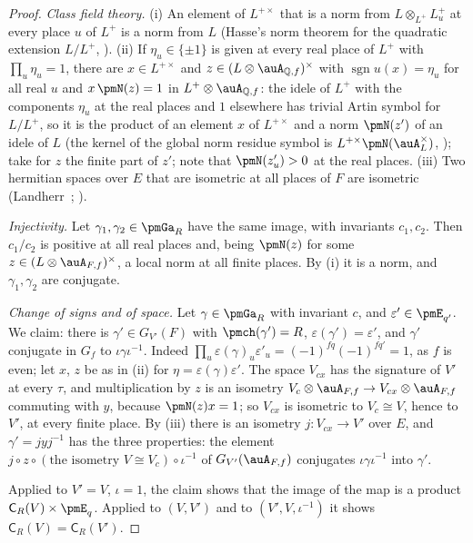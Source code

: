 \documentclass[10pt]{amsart}
\theoremstyle{definition}
\theoremstyle{remark}
\newcommand{\Q}{\mathbb Q}
\begin{document}
\begin{proof}
\emph{Class field theory.} (i) An element of $L^{+\times}$ that is a norm from $L\otimes_{L^+}L^+_u$
at every place $u$ of $L^+$ is a norm from $L$ (Hasse's norm theorem for the quadratic extension
$L/L^+$, \cite[Chapter~VI, Corollary~(4.5)]{Neukirch}). (ii) If $\eta_u\in\{\pm1\}$ is given at every real place of
$L^+$ with $\prod_u\eta_u=1$, there are $x\in L^{+\times}$ and $z\in(L\otimes\auA_{\Q,f})^\times$
with $\operatorname{sgn}u(x)=\eta_u$ for all real $u$ and $x\,\pmN(z)=1$ in $L^+\otimes\auA_{\Q,f}$:
the idele of $L^+$ with the components $\eta_u$ at the real places and $1$ elsewhere has trivial
Artin symbol for $L/L^+$, so it is the product of an element $x$ of $L^{+\times}$ and a norm
$\pmN(z')$ of an idele of $L$ (the kernel of the global norm residue symbol is $L^{+\times}\pmN(\auA_L^\times)$, \cite[Chapter~VI, Theorem~(5.5)]{Neukirch}); take for $z$ the finite part of $z'$; note that $\pmN(z'_u)>0$ at the real places. (iii) Two hermitian
spaces over $E$ that are isometric at all places of $F$ are isometric
(Landherr~\cite{Landherr}; \cite[Chapter~10, Theorem~6.1]{Scharlau}).

\emph{Injectivity.} Let $\gamma_1,\gamma_2\in\pmGa_R$ have the same image, with invariants
$c_1,c_2$. Then $c_1/c_2$ is positive at all real places and, being $\pmN(z)$ for some
$z\in(L\otimes\auA_{F,f})^\times$, a local norm at all finite places. By (i) it is a norm, and
$\gamma_1,\gamma_2$ are conjugate.

\emph{Change of signs and of space.} Let $\gamma\in\pmGa_R$ with invariant $c$, and
$\varepsilon'\in\pmE_{q'}$. We claim: there is $\gamma'\in G_{V'}(F)$ with $\pmch(\gamma')=R$,
$\varepsilon(\gamma')=\varepsilon'$, and $\gamma'$ conjugate in $G_f$ to $\iota\gamma\iota^{-1}$.
Indeed $\prod_u\varepsilon(\gamma)_u\varepsilon'_u=(-1)^{fq}(-1)^{fq'}=1$, as $f$ is even; let
$x$, $z$ be as in (ii) for $\eta=\varepsilon(\gamma)\varepsilon'$. The space $V_{cx}$ has the
signature of $V'$ at every $\tau$, and multiplication by $z$ is an isometry $V_c\otimes\auA_{F,f}
\to V_{cx}\otimes\auA_{F,f}$ commuting with $y$, because $\pmN(z)x=1$; so $V_{cx}$ is isometric to $V_c\cong V$, hence to
$V'$, at every finite place. By (iii) there is an isometry $j\colon V_{cx}\to V'$ over $E$, and
$\gamma'=jyj^{-1}$ has the three properties: the element $j\circ z\circ(\text{the isometry }V\cong
V_c)\circ\iota^{-1}$ of $G_{V'}(\auA_{F,f})$ conjugates $\iota\gamma\iota^{-1}$ into $\gamma'$.

Applied to $V'=V$, $\iota=1$, the claim shows that the image of the map is a product
$\mathsf C_R(V)\times\pmE_q$. Applied to $(V,V')$ and to $(V',V,\iota^{-1})$ it shows
$\mathsf C_R(V)=\mathsf C_R(V')$.
\end{proof}
\end{document}
